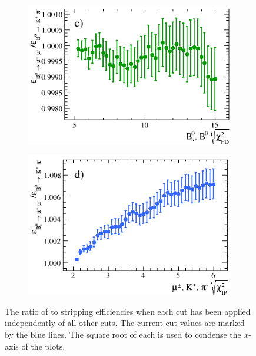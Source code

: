 \begin{figure}[htbp]
    \begin{subfigure}[b]{0.48\textwidth}
        \includegraphics[width=\textwidth]{./Figs/Selection/Bs2MuMu_KPi_FD.png}
        \label{fig:FD_ratioKPi}
    \end{subfigure}
   \begin{subfigure}[b]{0.48\textwidth}
        \includegraphics[width=\textwidth]{./Figs/Selection/Bs2MuMu_KPi_daughter_IP.png}
        \label{fig:IPS_ratioKPi}
    \end{subfigure}
    \caption{The ratio of \bsmumu to \bdkpi stripping efficiencies when each cut has been applied independently of all other cuts. The current cut values are marked by the blue lines. The square root of each \chisqd is used to condense the $x$-axis of the plots.}
    \label{fig:ratio_plotsBd2KPi}
\end{figure}



